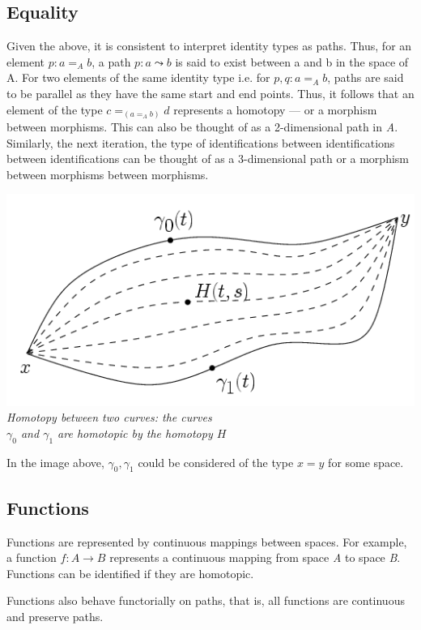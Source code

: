 \documentclass[12pt]{report}
\begin{document}
\subsection{Equality}
Given the above, it is consistent to interpret identity types as paths. Thus, for an element $p : a =_A b$, a path $ p : a \leadsto b $ is said to exist between a and b in the space of A. For two elements of the same identity type i.e. for $p,q : a =_A b$, paths are said to be parallel as they have the same start and end points. Thus, it follows that an element of the type $c =_{(a =_A b)} d$ represents a homotopy --- or a morphism between morphisms. This can also be thought of as a 2-dimensional path in \textit{A}. Similarly, the next iteration, the type of identifications between identifications between identifications can be thought of as a 3-dimensional path or a morphism between morphisms between morphisms.
\begin{center}
\includegraphics[scale=0.5]{./2.png}\\
\small{\textit{Homotopy between two curves: the curves\\ $\gamma_0$ and $ \gamma_1$ are homotopic by the homotopy $H$}}
\end{center}
In the image above, $\gamma_0, \gamma_1$ could be considered of the type $x = y$ for some space.

\subsection{Functions}
Functions are represented by continuous mappings between spaces. For example, a function $f : A \rightarrow B$ represents a continuous mapping from space \textit{A} to space \textit{B}. Functions can be identified if they are homotopic.

Functions also behave functorially on paths, that is, all functions are continuous and preserve paths.
\end{document}
